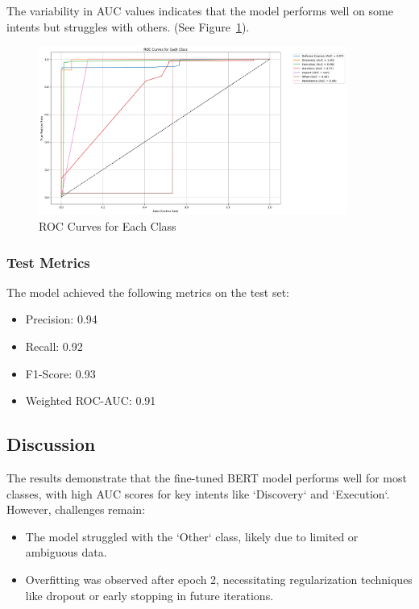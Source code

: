             The variability in AUC values indicates that the model performs well on some intents but struggles with others. (See Figure~\ref{fig:roc}).

            \begin{figure}[h]
                \centering
                \includegraphics[width=0.9\textwidth]{../figures/plots/section4/ROC_Curve.png}
                \caption{ROC Curves for Each Class}
                \label{fig:roc}
            \end{figure}

        \subsubsection{Test Metrics \\}
        
            The model achieved the following metrics on the test set:
            
            \begin{itemize}
                \item Precision: 0.94
                \item Recall: 0.92
                \item F1-Score: 0.93
                \item Weighted ROC-AUC: 0.91
            \end{itemize}

    \subsection{Discussion}
    
        The results demonstrate that the fine-tuned BERT model performs well for most classes, with high AUC scores for key intents like `Discovery` and `Execution`. However, challenges remain:
        
        \begin{itemize}
        
            \item The model struggled with the `Other` class, likely due to limited or ambiguous data.
            
            \item Overfitting was observed after epoch 2, necessitating regularization techniques like dropout or early stopping in future iterations.
            
        \end{itemize}

